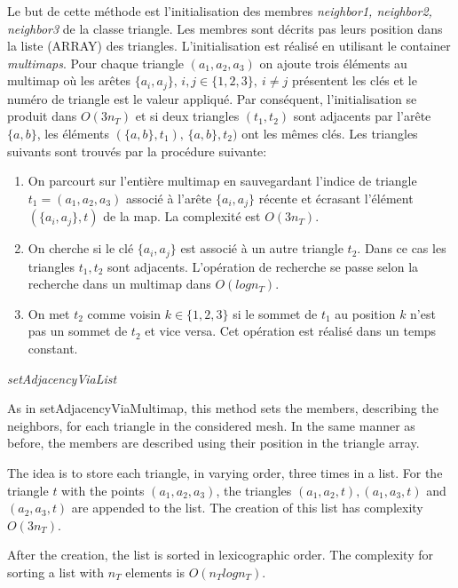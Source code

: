 \documentclass[10pt]{article}
\begin{document}
Le but de cette m\'ethode est l'initialisation des membres {\itshape neighbor1, neighbor2, neighbor3} de la classe triangle. Les membres sont décrits pas leurs position dans la liste (ARRAY) des triangles. L'initialisation est réalisé en utilisant le container {\itshape multimaps}.  Pour chaque triangle $(a_1,a_2,a_3)$ on ajoute trois éléments au multimap où les arêtes $\{a_i,a_j \}, \, i,j \in \{1,2,3\}, \ i \neq j $ présentent les clés et le numéro de triangle est le valeur appliqué. Par conséquent, l'initialisation se produit dans $ O(3 n_T)$ et si deux triangles $(t_1,t_2) $ sont adjacents par l'arête $\{a,b\}$, les éléments $ ( \{a,b\}, t_1), \, \{a,b\}, t_2) $ ont les mêmes clés. 
Les triangles suivants sont trouvés par la procédure suivante: 
\begin{enumerate}
	\item On parcourt sur l'entière multimap en sauvegardant l'indice de  triangle $t_1 = (a_1,a_2,a_3) $ associé à l'arête $ \{a_i,a_j\} $ récente et écrasant l'élément $(\{a_i,a_j\}, t) $ de la map. La complexité est $ O(3 n_T)$.
	\item On cherche si le clé $ \{a_i,a_j\} $ est associé à un autre triangle $t_2$. Dans ce cas les triangles $t_1,t_2$ sont adjacents. 
	L'opération de recherche se passe selon la recherche dans un multimap dans $O(log n_T) $.
	\item On met $t_2 $ comme voisin $k \in \{1,2,3\}$ si le sommet de $t_1 $ au position $k$ n'est pas un sommet de $t_2 $ et vice versa. Cet opération est réalisé dans un temps constant.
\end{enumerate}


\centering
{\large \itshape{setAdjacencyViaList} } 

\raggedright

As in setAdjacencyViaMultimap, this method sets the members, describing the neighbors, for each triangle in the considered mesh. In the same manner as before, the members are described using their position in the triangle array.

The idea is to store each triangle, in varying order, three times in a list. For the triangle $t$ with the points $(a_1,a_2,a_3)$, the triangles $(a_1,a_2,t), (a_1,a_3,t)$ and $(a_2,a_3,t)$ are appended to the list. The creation of this list has complexity $O(3n_T)$.

After the creation, the list is sorted in lexicographic order. The complexity for sorting a list with $n_T$ elements is $O(n_Tlogn_T)$.
\end{document}
